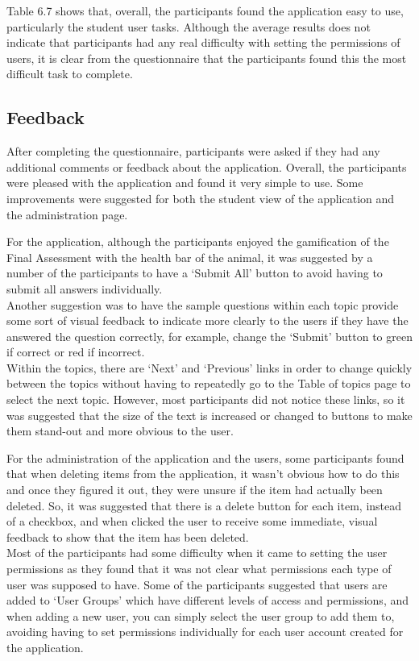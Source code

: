 \documentclass{l3proj}
\begin{document}
Table 6.7 shows that, overall, the participants found the application easy to use, particularly the student user tasks.
Although the average results does not indicate that participants had any real difficulty with setting the permissions of users, it is clear from the questionnaire that the participants found this the most difficult task to complete.

\subsection{Feedback}

After completing the questionnaire, participants were asked if they had any additional comments or feedback about the application. Overall, the participants were pleased with the application and found it very simple to use. Some improvements were suggested for both the student view of the application and the administration page.

For the application, although the participants enjoyed the gamification of the Final Assessment with the health bar of the animal, it was suggested by a number of the participants to have a `Submit All' button to avoid having to submit all answers individually.\\
Another suggestion was to have the sample questions within each topic provide some sort of visual feedback to indicate more clearly to the users if they have the answered the question correctly, for example, change the `Submit' button to green if correct or red if incorrect.\\
Within the topics, there are `Next' and `Previous' links in order to change quickly between the topics without having to repeatedly go to the Table of topics page to select the next topic. However, most participants did not notice these links, so it was suggested that the size of the text is increased or changed to buttons to make them stand-out and more obvious to the user.

For the administration of the application and the users, some participants found that when deleting items from the application, it wasn't obvious how to do this and once they figured it out, they were unsure if the item had actually been deleted. So, it was suggested that there is a delete button for each item, instead of a checkbox, and when clicked the user to receive some immediate, visual feedback to show that the item has been deleted.\\ 
Most of the participants had some difficulty when it came to setting the user permissions as they found that it was not clear what permissions each type of user was supposed to have. Some of the participants suggested that users are added to  `User Groups' which have different levels of access and permissions, and when adding a new user, you can simply select the user group to add them to, avoiding having to set permissions individually for each user account created for the application.
\end{document}
